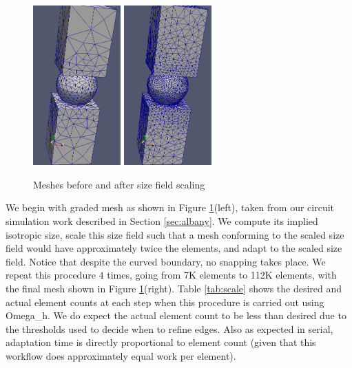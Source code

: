 \begin{figure}
\begin{center}
\includegraphics[width=0.3\textwidth]{scale_7k.png}
\includegraphics[width=0.3\textwidth]{scale_112k.png}
\caption{
Meshes before and after size field scaling}
\label{fig:scale}
\end{center}
\end{figure}

We begin with graded mesh as shown in Figure \ref{fig:scale}(left),
taken from our circuit simulation work described in Section \ref{sec:albany}.
We compute its implied isotropic size, scale this size field such
that a mesh conforming to the scaled size field would have
approximately twice the elements, and adapt to the scaled size
field.
Notice that despite the curved boundary, no snapping takes
place.
We repeat this procedure $4$ times, going from 7K elements to 112K elements,
with the final mesh shown in Figure \ref{fig:scale}(right).
Table \ref{tab:scale} shows the desired and actual element
counts at each step when this procedure is carried out
using Omega\_h.
We do expect the actual element count to be less than desired
due to the thresholds used to decide when to refine edges.
Also as expected in serial, adaptation time is directly
proportional to element count (given that this workflow
does approximately equal work per element).

